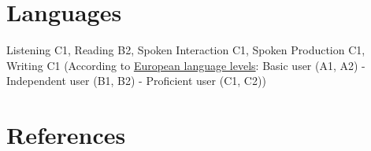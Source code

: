 \documentclass[10pt, a4paper]{article}
\begin{document}
	\section*{Languages}
	
	 Listening C1, Reading B2, Spoken Interaction C1, Spoken Production C1, Writing C1
	\small (According to \href{https://europass.cedefop.europa.eu/resources/european-language-levels-cefr}{European language levels}: Basic user (A1, A2) - Independent user (B1, B2) - Proficient user (C1, C2))\\
	

	\section*{References}
	

	

	
		
\end{document}
